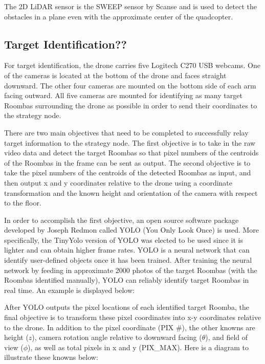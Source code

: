 \documentclass[12pt,letterpaper]{article}
\begin{document}
			The 2D LiDAR sensor is the SWEEP sensor by Scanse and is used to detect the obstacles in a plane even with the approximate center of the quadcopter.

		\subsection*{Target Identification??}
			For target identification, the drone carries five Logitech C270 USB webcams. One of the cameras is located at the bottom of the drone and faces straight downward. The other four cameras are mounted on the bottom side of each arm facing outward. All five cameras are mounted for identifying as many target Roombas surrounding the drone as possible in order to send their coordinates to the strategy node.

			There are two main objectives that need to be completed to successfully relay target information to the strategy node. The first objective is to take in the raw video data and detect the target Roombas so that pixel numbers of the centroids of the Roombas in the frame can be sent as output. The second objective is to take the pixel numbers of the centroids of the detected Roombas as input, and then output x and y coordinates relative to the drone using a coordinate transformation and the known height and orientation of the camera with respect to the floor.

			In order to accomplish the first objective, an open source software package developed by Joseph Redmon called YOLO (You Only Look Once) is used. More specifically, the TinyYolo version of YOLO was elected to be used since it is lighter and can obtain higher frame rates. YOLO is a neural network that can identify user-defined objects once it has been trained. After training the neural network by feeding in approximate 2000 photos of the target Roombas (with the Roombas identified manually), YOLO can reliably identify target Roombas in real time. An example is displayed below:


			After YOLO outputs the pixel locations of each identified target Roomba, the final objective is to transform these pixel coordinates into x-y coordinates relative to the drone. In addition to the pixel coordinate (PIX \#), the other knowns are height ($z$), camera rotation angle relative to downward facing ($\theta$), and field of view ($\phi$), as well as total pixels in x and y (PIX\_MAX).  Here is a diagram to illustrate these knowns below:
\end{document}
